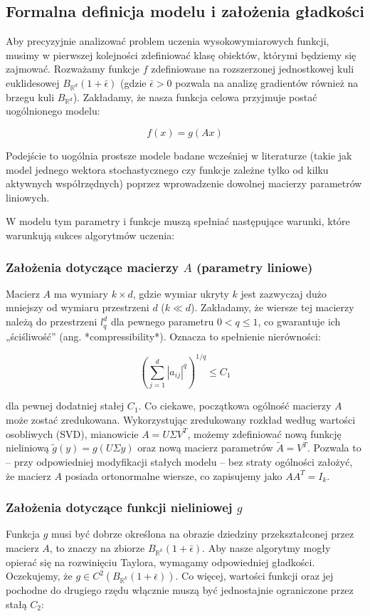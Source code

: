\subsection{Formalna definicja modelu i założenia gładkości}

Aby precyzyjnie analizować problem uczenia wysokowymiarowych funkcji, musimy w pierwszej kolejności zdefiniować klasę obiektów, którymi będziemy się zajmować. Rozważamy funkcje $f$ zdefiniowane na rozszerzonej jednostkowej kuli euklidesowej $B_{\mathbb{R}^d}(1+\bar{\epsilon})$ (gdzie $\bar{\epsilon} > 0$ pozwala na analizę gradientów również na brzegu kuli $B_{\mathbb{R}^d}$). Zakładamy, że nasza funkcja celowa przyjmuje postać uogólnionego modelu:


$$f(x) = g(Ax)$$

Podejście to uogólnia prostsze modele badane wcześniej w literaturze (takie jak model jednego wektora stochastycznego czy funkcje zależne tylko od kilku aktywnych współrzędnych) poprzez wprowadzenie dowolnej macierzy parametrów liniowych.

W modelu tym parametry i funkcje muszą spełniać następujące warunki, które warunkują sukces algorytmów uczenia:

\subsubsection{Założenia dotyczące macierzy $A$ (parametry liniowe)}

Macierz $A$ ma wymiary $k \times d$, gdzie wymiar ukryty $k$ jest zazwyczaj dużo mniejszy od wymiaru przestrzeni $d$ ($k \ll d$). Zakładamy, że wiersze tej macierzy należą do przestrzeni $l_q^d$ dla pewnego parametru $0 < q \le 1$, co gwarantuje ich „ściśliwość” (ang. *compressibility*). Oznacza to spełnienie nierówności:


$$(\sum_{j=1}^d |a_{ij}|^q)^{1/q} \le C_1$$

dla pewnej dodatniej stałej $C_1$.
Co ciekawe, początkowa ogólność macierzy $A$ może zostać zredukowana. Wykorzystując zredukowany rozkład według wartości osobliwych (SVD), mianowicie $A = U \Sigma V^T$, możemy zdefiniować nową funkcję nieliniową $\tilde{g}(y) = g(U\Sigma y)$ oraz nową macierz parametrów $\tilde{A} = V^T$. Pozwala to – przy odpowiedniej modyfikacji stałych modelu – bez straty ogólności założyć, że macierz $A$ posiada ortonormalne wiersze, co zapisujemy jako $AA^T = I_k$.

\subsubsection{Założenia dotyczące funkcji nieliniowej $g$}
Funkcja $g$ musi być dobrze określona na obrazie dziedziny przekształconej przez macierz $A$, to znaczy na zbiorze $B_{\mathbb{R}^k}(1+\bar{\epsilon})$. Aby nasze algorytmy mogły opierać się na rozwinięciu Taylora, wymagamy odpowiedniej gładkości. Oczekujemy, że $g \in C^2(B_{\mathbb{R}^k}(1+\bar{\epsilon}))$. Co więcej, wartości funkcji oraz jej pochodne do drugiego rzędu włącznie muszą być jednostajnie ograniczone przez stałą $C_2$:


